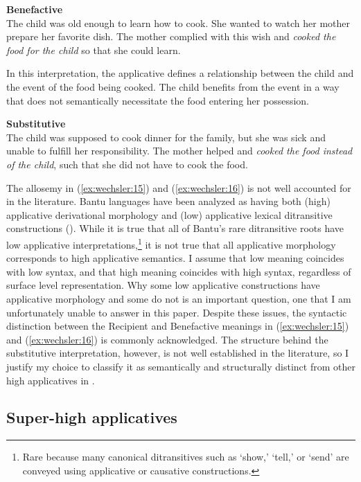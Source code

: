 \documentclass[output=paper,modfonts,nonflat,colorlinks,citecolor=brown]{langsci/langscibook}
\begin{document}
\ea\label{ex:wechsler:16}
\textbf{Benefactive}\\
The child was old enough to learn how to cook. She wanted to watch her mother prepare her favorite dish. The mother complied with this wish and \textit{cooked the food for the child} so that she could learn.\z

In this interpretation, the applicative defines a relationship between the child and the event of the food being cooked. The child benefits from the event in a way that does not semantically necessitate the food entering her possession.


\ea\label{ex:wechsler:17}
\textbf{Substitutive}\\
The child was supposed to cook dinner for the family, but she was sick and unable to fulfill her responsibility. The mother helped and \textit{cooked the food instead of the child}, such that she did not have to cook the food.\\
\z

The allosemy in (\ref{ex:wechsler:15}) and (\ref{ex:wechsler:16}) is not well accounted for in the literature. Bantu languages have been analyzed as having both (high) applicative derivational morphology and (low) applicative lexical ditransitive constructions (\citealt{vanderWal2017}). While it is true that all of Bantu’s rare ditransitive roots have low applicative interpretations,\footnote{Rare because many canonical ditransitives such as ‘show,’ ‘tell,’ or ‘send’ are conveyed using applicative or causative constructions.}  it is not true that all applicative morphology corresponds to high applicative semantics. I assume that low meaning coincides with low syntax, and that high meaning coincides with high syntax, regardless of surface level representation. Why some low applicative constructions have applicative morphology and some do not is an important question, one that I am unfortunately unable to answer in this paper. Despite these issues, the syntactic distinction between the Recipient and Benefactive meanings in (\ref{ex:wechsler:15}) and (\ref{ex:wechsler:16}) is commonly acknowledged. The structure behind the substitutive interpretation, however, is not well established in the literature, so I justify my choice to classify it as semantically and structurally distinct from other high applicatives in .

\subsection{Super-high applicatives}\label{sec:wechsler:3.3}
\end{document}
